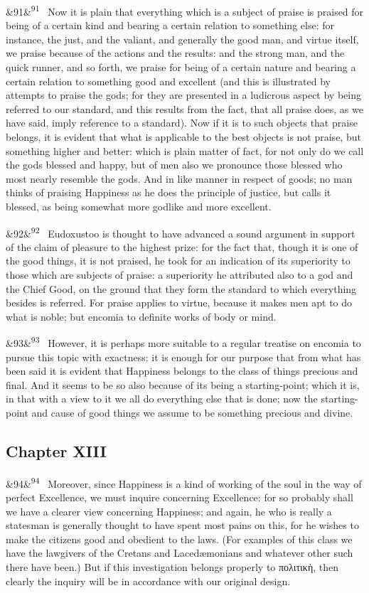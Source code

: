 \documentclass[12pt]{article}
\newcommand{\para}[1][]{\par\noindent\ifx&#1&\else\textsuperscript{\footnotesize #1}~\fi}
\begin{document}
\para[91] Now it is plain that everything which is a subject of praise is praised for being of a certain kind and bearing a certain relation to something else: for instance, the just, and the valiant, and generally the good man, and virtue itself, we praise because of the actions and the results: and the strong man, and the quick runner, and so forth, we praise for being of a certain nature and bearing a certain relation to something good and excellent (and this is illustrated by attempts to praise the gods; for they are presented in a ludicrous aspect by being referred to our standard, and this results from the fact, that all praise does, as we have said, imply reference to a standard). Now if it is to such objects that praise belongs, it is evident that what is applicable to the best objects is not praise, but something higher and better: which is plain matter of fact, for not only do we call the gods blessed and happy, but of men also we pronounce those blessed who most nearly resemble the gods. And in like manner in respect of goods; no man thinks of praising Happiness as he does the principle of justice, but calls it blessed, as being somewhat more godlike and more excellent.

\para[92] Eudoxustoo is thought to have advanced a sound argument in support of the claim of pleasure to the highest prize: for the fact that, though it is one of the good things, it is not praised, he took for an indication of its superiority to those which are subjects of praise: a superiority he attributed also to a god and the Chief Good, on the ground that they form the standard to which everything besides is referred. For praise applies to virtue, because it makes men apt to do what is noble; but encomia to definite works of body or mind.

\para[93] However, it is perhaps more suitable to a regular treatise on encomia to pursue this topic with exactness: it is enough for our purpose that from what has been said it is evident that Happiness belongs to the class of things precious and final. And it seems to be so also because of its being a starting-point; which it is, in that with a view to it we all do everything else that is done; now the starting-point and cause of good things we assume to be something precious and divine.

\subsection*{Chapter XIII}

\para[94] Moreover, since Happiness is a kind of working of the soul in the way of perfect Excellence, we must inquire concerning Excellence: for so probably shall we have a clearer view concerning Happiness; and again, he who is really a statesman is generally thought to have spent most pains on this, for he wishes to make the citizens good and obedient to the laws. (For examples of this class we have the lawgivers of the Cretans and Lacedæmonians and whatever other such there have been.) But if this investigation belongs properly to πολιτικὴ, then clearly the inquiry will be in accordance with our original design.
\end{document}
